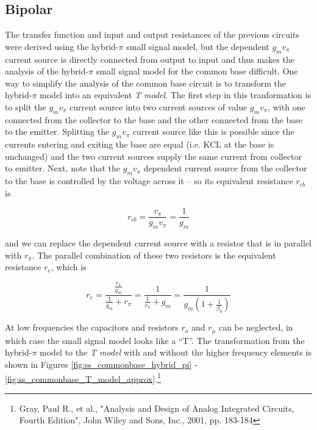 \subsection{Bipolar}
\par
The transfer function and input and output resistances of the previous circuits were derived using the hybrid-$\pi$ small signal model, but the dependent $g_{m}v_{\pi}$ current source is directly connected from output to input and thus makes the analysis of the hybrid-$\pi$ small signal model for the common base difficult. One way to simplify the analysis of the common base circuit is to transform the hybrid-$\pi$ model into an equivalent \textsl{T model}. The first step in this tranformation is to split the $g_{m}v_{\pi}$ current source into two current sources of value $g_{m}v_{\pi}$, with one connected from the collector to the base and the other connected from the base to the emitter. Splitting the $g_{m}v_{\pi}$ current source like this is possible since the currents entering and exiting the base are equal (i.e. KCL at the base is unchanged) and the two current sources supply the same current from collector to emitter. Next, note that the $g_{m}v_{\pi}$ dependent current source from the collector to the base is controlled by the voltage across it -- so its equivalent resistance $r_{cb}$ is

\begin{equation}
r_{cb} = \frac{v_{\pi}}{g_{m}v_{\pi}} = \frac{1}{g_{m}}
\end{equation}

\noindent and we can replace the dependent current source with a resistor that is in parallel with $r_{\pi}$. The parallel combination of these two resistors is the equivalent resistance $r_{e}$, which is

\begin{equation}
r_{e} = \frac{\frac{r_{\pi}}{g_{m}}}{\frac{1}{g_{m}}+r_{\pi}} = \frac{1}{\frac{1}{r_{\pi}}+g_{m}} = \frac{1}{g_{m}\left(1+\frac{1}{\beta_{0}}\right)}
\end{equation}

\noindent At low frequencies the capacitors and resistors $r_{o}$ and $r_{\mu}$ can be neglected, in which case the small signal model looks like a ``T''. The transformation from the hybrid-$\pi$ model to the \textsl{T model} with and without the higher frequency elements is shown in Figures \ref{fig:ss_commonbase_hybrid_pi} - \ref{fig:ss_commonbase_T_model_approx}.\footnote{Gray, Paul R., et al., "Analysis and Design of Analog Integrated Circuits, Fourth Edition", John Wiley and Sons, Inc., 2001, pp. 183-184}

